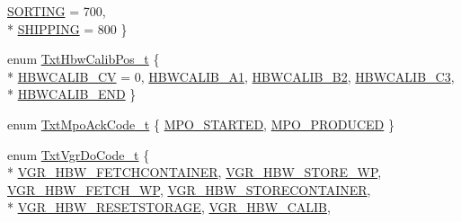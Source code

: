 \begin{DoxyCompactItemize}
\hyperlink{namespaceft_a159b26268d167d1a15cca7e324a25abfabd0d7bc7e47554a48351614d3483ad40}{S\+O\+R\+T\+I\+NG} = 700, 
\\*
\hyperlink{namespaceft_a159b26268d167d1a15cca7e324a25abfaff9598f7ea053930e489fe9e458b32b8}{S\+H\+I\+P\+P\+I\+NG} = 800
 \}
\item 
enum \hyperlink{namespaceft_a88bb8b41aa7e6a6d38447ae6f2caa4b5}{Txt\+Hbw\+Calib\+Pos\+\_\+t} \{ \\*
\hyperlink{namespaceft_a88bb8b41aa7e6a6d38447ae6f2caa4b5a357577c6e6955c36ba2e6cae3cfabb4b}{H\+B\+W\+C\+A\+L\+I\+B\+\_\+\+CV} = 0, 
\hyperlink{namespaceft_a88bb8b41aa7e6a6d38447ae6f2caa4b5a3f20a0ae66feecf517473f0c8345aecb}{H\+B\+W\+C\+A\+L\+I\+B\+\_\+\+A1}, 
\hyperlink{namespaceft_a88bb8b41aa7e6a6d38447ae6f2caa4b5a67711063b67c686b438e60c81f7b40fb}{H\+B\+W\+C\+A\+L\+I\+B\+\_\+\+B2}, 
\hyperlink{namespaceft_a88bb8b41aa7e6a6d38447ae6f2caa4b5ade03aea25d85305d2e53fa7796016a56}{H\+B\+W\+C\+A\+L\+I\+B\+\_\+\+C3}, 
\\*
\hyperlink{namespaceft_a88bb8b41aa7e6a6d38447ae6f2caa4b5a87440f71493b984ccae4b6f562fe9ffe}{H\+B\+W\+C\+A\+L\+I\+B\+\_\+\+E\+ND}
 \}
\item 
enum \hyperlink{namespaceft_a368e4d4d861f00b9f4faa23c052bdb46}{Txt\+Mpo\+Ack\+Code\+\_\+t} \{ \hyperlink{namespaceft_a368e4d4d861f00b9f4faa23c052bdb46addc502e1e315a45e8392b73591898cc7}{M\+P\+O\+\_\+\+S\+T\+A\+R\+T\+ED}, 
\hyperlink{namespaceft_a368e4d4d861f00b9f4faa23c052bdb46af64ed7072e8ab197018a3d046d322099}{M\+P\+O\+\_\+\+P\+R\+O\+D\+U\+C\+ED}
 \}
\item 
enum \hyperlink{namespaceft_a91a43ab1445a680e5e113eec631eb030}{Txt\+Vgr\+Do\+Code\+\_\+t} \{ \\*
\hyperlink{namespaceft_a91a43ab1445a680e5e113eec631eb030a30ebf545b142bee54996fbcba584450e}{V\+G\+R\+\_\+\+H\+B\+W\+\_\+\+F\+E\+T\+C\+H\+C\+O\+N\+T\+A\+I\+N\+ER}, 
\hyperlink{namespaceft_a91a43ab1445a680e5e113eec631eb030a2b32a93c5dafed59d240aaa1086602d2}{V\+G\+R\+\_\+\+H\+B\+W\+\_\+\+S\+T\+O\+R\+E\+\_\+\+WP}, 
\hyperlink{namespaceft_a91a43ab1445a680e5e113eec631eb030a1a1555775b5f7dd22781e6755d0aa67a}{V\+G\+R\+\_\+\+H\+B\+W\+\_\+\+F\+E\+T\+C\+H\+\_\+\+WP}, 
\hyperlink{namespaceft_a91a43ab1445a680e5e113eec631eb030a8940b8f6648d3a9c7d8fe182a0d97127}{V\+G\+R\+\_\+\+H\+B\+W\+\_\+\+S\+T\+O\+R\+E\+C\+O\+N\+T\+A\+I\+N\+ER}, 
\\*
\hyperlink{namespaceft_a91a43ab1445a680e5e113eec631eb030affce488c63ce526d82b51896cba23f38}{V\+G\+R\+\_\+\+H\+B\+W\+\_\+\+R\+E\+S\+E\+T\+S\+T\+O\+R\+A\+GE}, 
\hyperlink{namespaceft_a91a43ab1445a680e5e113eec631eb030aafafa2be7003a43ebed177804bd9fc6d}{V\+G\+R\+\_\+\+H\+B\+W\+\_\+\+C\+A\+L\+IB}, 

\end{DoxyCompactItemize}
